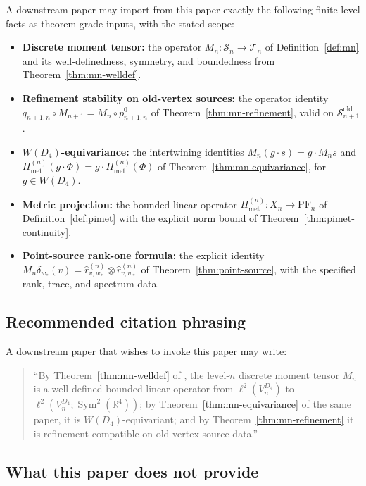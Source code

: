\documentclass[11pt, a4paper]{amsart}
\theoremstyle{definition}
\newcommand{\R}{\mathbb{R}}
\newcommand{\Sym}{\operatorname{Sym}}
\newcommand{\Met}{\mathrm{met}}
\newcommand{\PF}{\mathrm{PF}}
\newcommand{\Pimet}{\Pi_{\Met}}
\begin{document}
A downstream paper may import from this paper exactly the
following finite-level facts as theorem-grade inputs, with the
stated scope:
\begin{itemize}
\item \textbf{Discrete moment tensor:} the operator
  $M_n \colon \mathcal S_n \to \mathcal T_n$ of
  Definition~\ref{def:mn} and its well-definedness, symmetry,
  and boundedness from Theorem~\ref{thm:mn-welldef}.
\item \textbf{Refinement stability on old-vertex sources:} the
  operator identity $q_{n+1, n} \circ M_{n+1} = M_n \circ
  p_{n+1, n}^0$ of Theorem~\ref{thm:mn-refinement}, valid on
  $\mathcal S_{n+1}^{\mathrm{old}}$.
\item \textbf{$W(D_4)$-equivariance:} the intertwining
  identities $M_n(g\cdot s) = g \cdot M_n s$ and
  $\Pimet^{(n)}(g \cdot \Phi) = g \cdot \Pimet^{(n)}(\Phi)$ of
  Theorem~\ref{thm:mn-equivariance}, for $g \in W(D_4)$.
\item \textbf{Metric projection:} the bounded linear operator
  $\Pimet^{(n)} \colon X_n \to \PF_n$ of
  Definition~\ref{def:pimet} with the explicit norm bound of
  Theorem~\ref{thm:pimet-continuity}.
\item \textbf{Point-source rank-one formula:} the explicit
  identity $M_n \delta_{w_\ast}(v) = \hat r_{v, w_\ast}^{(n)}
  \otimes \hat r_{v, w_\ast}^{(n)}$ of
  Theorem~\ref{thm:point-source}, with the specified rank,
  trace, and spectrum data.
\end{itemize}

\subsection{Recommended citation phrasing}

A downstream paper that wishes to invoke this paper may
write:
\begin{quote}
  ``By Theorem~\ref{thm:mn-welldef} of \cite{MetricProjection},
  the level-$n$ discrete moment tensor $M_n$ is a well-defined
  bounded linear operator from $\ell^2(V_n^{D_4})$ to
  $\ell^2(V_n^{D_4}; \Sym^2(\R^4))$; by
  Theorem~\ref{thm:mn-equivariance} of the same paper, it is
  $W(D_4)$-equivariant; and by Theorem~\ref{thm:mn-refinement}
  it is refinement-compatible on old-vertex source data.''
\end{quote}

\subsection{What this paper does not provide}
\end{document}
